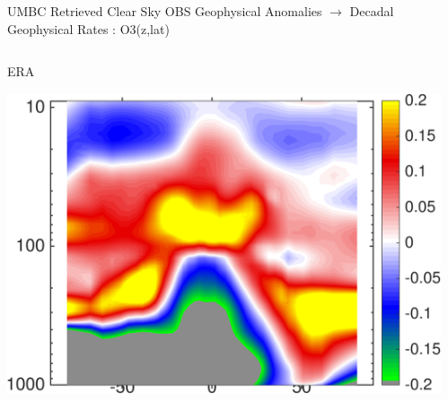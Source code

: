 \documentclass[10pt,t]{beamer}
\begin{document}
\begin{frame}{UMBC Retrieved Clear Sky OBS Geophysical Anomalies $\rightarrow$ Decadal Geophysical Rates : O3(z,lat)}
\vspace{-0.35in}

\begin{columns}
\begin{column}{0.45\columnwidth}
\begin{block}{\footnotesize ERA}
\vspace{-0.1in}
\begin{center}
\includegraphics[width=\linewidth]{Figs/ClearAnom/rawERAo3rates.png}
\end{center}
\end{block}
\end{column}

\begin{column}{0.45\columnwidth}
\end{column}
\end{columns}

\vspace{-0.25in}


\end{frame}
\end{document}
